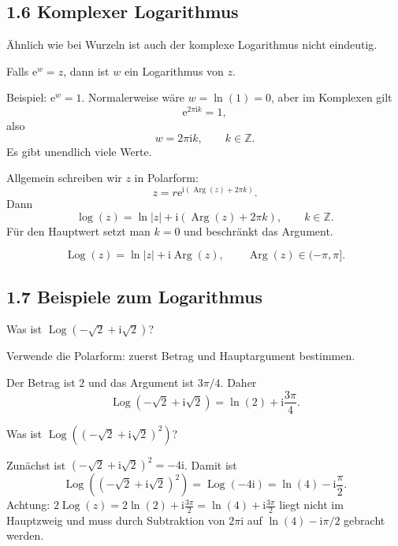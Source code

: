 \documentclass[11pt,a4paper]{article}
\newcommand{\Z}{\mathbb Z}
\newcommand{\ii}{\mathrm i}
\newcommand{\ee}{\mathrm e}
\newcommand{\Arg}{\operatorname{Arg}}
\newcommand{\Log}{\operatorname{Log}}
\begin{document}
\subsection{1.6 Komplexer Logarithmus}
Ähnlich wie bei Wurzeln ist auch der komplexe Logarithmus nicht eindeutig.

\begin{importantbox}
Falls $\ee^w=z$, dann ist $w$ ein Logarithmus von $z$.
\end{importantbox}

Beispiel: $\ee^w=1$. Normalerweise wäre $w=\ln(1)=0$, aber im Komplexen gilt
\[
\ee^{2\pi\ii k}=1,
\]
also
\[
w=2\pi\ii k,\qquad k\in\Z.
\]
Es gibt unendlich viele Werte.

Allgemein schreiben wir $z$ in Polarform:
\[
z=r\ee^{\ii(\Arg(z)+2\pi k)}.
\]
Dann
\[
\log(z)=\ln|z|+\ii(\Arg(z)+2\pi k),\qquad k\in\Z.
\]
Für den Hauptwert setzt man $k=0$ und beschränkt das Argument.

\begin{importantbox}
\[
\Log(z)=\ln|z|+\ii\Arg(z),\qquad \Arg(z)\in(-\pi,\pi].
\]
\end{importantbox}

\subsection{1.7 Beispiele zum Logarithmus}
\begin{fragebox}
Was ist $\Log(-\sqrt2+\ii\sqrt2)$?
\end{fragebox}
\begin{tippbox}
Verwende die Polarform: zuerst Betrag und Hauptargument bestimmen.
\end{tippbox}
\begin{antwortbox}
Der Betrag ist $2$ und das Argument ist $3\pi/4$. Daher
\[
\Log(-\sqrt2+\ii\sqrt2)=\ln(2)+\ii\frac{3\pi}{4}.
\]
\end{antwortbox}

\begin{fragebox}
Was ist $\Log((-\sqrt2+\ii\sqrt2)^2)$?
\end{fragebox}
\begin{antwortbox}
Zunächst ist $(-\sqrt2+\ii\sqrt2)^2=-4\ii$. Damit ist
\[
\Log((-\sqrt2+\ii\sqrt2)^2)=\Log(-4\ii)=\ln(4)-\ii\frac{\pi}{2}.
\]
Achtung: $2\Log(z)=2\ln(2)+\ii\frac{3\pi}{2}=\ln(4)+\ii\frac{3\pi}{2}$ liegt nicht im Hauptzweig und muss durch Subtraktion von $2\pi\ii$ auf $\ln(4)-\ii\pi/2$ gebracht werden.
\end{antwortbox}
\end{document}
